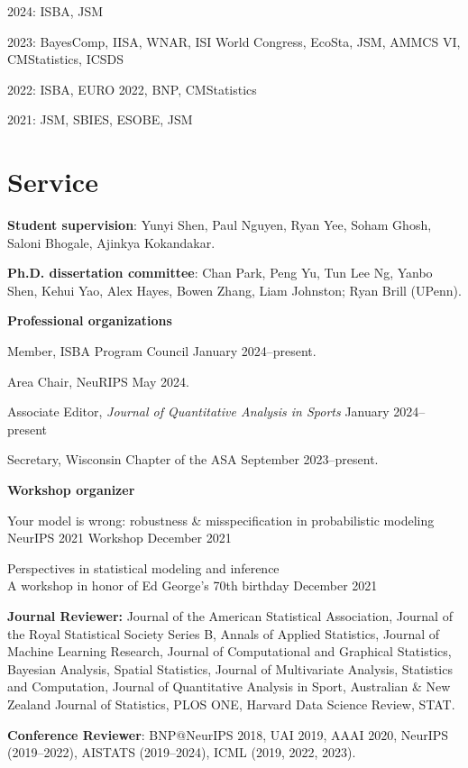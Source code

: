 \documentclass[10pt]{article}
\renewenvironment{itemize}{
  \begin{list}{}{
    \setlength{\leftmargin}{1.5em}
  }
}{
  \end{list}
}
\begin{document}
\begin{itemize}

\item{2024: ISBA, JSM}
\item{2023: BayesComp, IISA, WNAR, ISI World Congress, EcoSta, JSM, AMMCS VI, CMStatistics, ICSDS}
\item{2022: ISBA, EURO 2022, BNP, CMStatistics}
\item{2021: JSM, SBIES, ESOBE, JSM}

\end{itemize}

\section*{Service}

\textbf{Student supervision}: Yunyi Shen, Paul Nguyen, Ryan Yee, Soham Ghosh, Saloni Bhogale, Ajinkya Kokandakar.

\textbf{Ph.D. dissertation committee}: Chan Park, Peng Yu, Tun Lee Ng, Yanbo Shen, Kehui Yao, Alex Hayes, Bowen Zhang, Liam Johnston; Ryan Brill (UPenn).

\textbf{Professional organizations}

\begin{itemize}
\item{Member, ISBA Program Council \hfill January 2024--present.}
\item{Area Chair, NeuRIPS \hfill May 2024.}
\item{Associate Editor, \textit{Journal of Quantitative Analysis in Sports} \hfill January 2024--present}
\item{Secretary, Wisconsin Chapter of the ASA \hfill September 2023--present.}

\end{itemize}

\textbf{Workshop organizer} 

\begin{itemize}
\item{Your model is wrong: robustness \& misspecification in probabilistic modeling \\
NeurIPS 2021 Workshop \hfill December 2021}
\item{Perspectives in statistical modeling and inference \\
A workshop in honor of Ed George's 70th birthday \hfill December 2021
}
\end{itemize}

\textbf{Journal Reviewer:} Journal of the American Statistical Association, Journal of the Royal Statistical Society Series B, Annals of Applied Statistics, Journal of Machine Learning Research, Journal of Computational and Graphical Statistics, Bayesian Analysis, Spatial Statistics, Journal of Multivariate Analysis, Statistics and Computation, Journal of Quantitative Analysis in Sport, Australian \& New Zealand Journal of Statistics, PLOS ONE, Harvard Data Science Review, STAT. 

\textbf{Conference Reviewer}: BNP@NeurIPS 2018, UAI 2019, AAAI 2020,  NeurIPS (2019--2022), AISTATS (2019--2024), ICML (2019, 2022, 2023).
\end{document}
